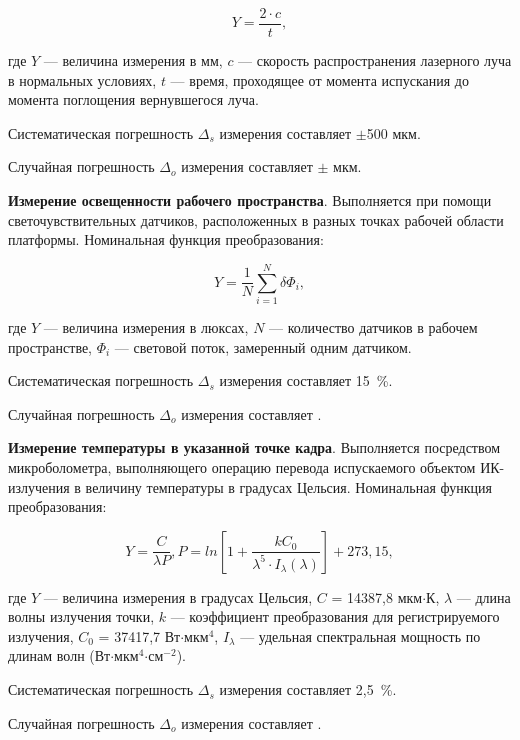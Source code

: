 \begin{equation}
Y = \frac{2 \cdot c}{t},
\label{eq_3_22}
\end{equation}

где $Y$ --- величина измерения в мм, $c$ --- скорость распространения лазерного луча в нормальных условиях, $t$ --- время, проходящее от момента испускания до момента поглощения вернувшегося луча.

Систематическая погрешность $\Delta_s$ измерения составляет $\pm$500 мкм.

Случайная погрешность $\Delta_o$ измерения составляет $\pm$ мкм.

\textbf{Измерение освещенности рабочего пространства}. Выполняется при помощи светочувствительных датчиков, расположенных в разных точках рабочей области платформы. Номинальная функция преобразования:

\begin{equation}
Y = \frac{1}{N} \sum_{i=1}^{N} \delta \Phi_i,
\label{eq_3_23}
\end{equation}

где $Y$ --- величина измерения в люксах, $N$ --- количество датчиков в рабочем пространстве, $\Phi_i$ --- световой поток, замеренный одним датчиком.

Систематическая погрешность $\Delta_s$ измерения составляет 15~\%.

Случайная погрешность $\Delta_o$ измерения составляет .

\textbf{Измерение температуры в указанной точке кадра}. Выполняется посредством микроболометра, выполняющего операцию перевода испускаемого объектом ИК-излучения в величину температуры в градусах Цельсия. Номинальная функция преобразования:

\begin{equation}
Y = \frac{C}{\lambda P}, P = ln[1 + \frac{kC_0}{\lambda^5 \cdot I_\lambda (\lambda)}] + 273,15,
\label{eq_3_24}
\end{equation}

где $Y$ --- величина измерения в градусах Цельсия, $C$ = 14387,8 мкм$\cdot$К, $\lambda$ --- длина волны излучения точки, $k$ --- коэффициент преобразования для регистрируемого излучения, $C_0$ = 37417,7 Вт$\cdot$мкм$^4$, $I_\lambda$ --- удельная спектральная мощность по длинам волн (Вт$\cdot$мкм$^4$$\cdot$см$^{-2}$).

Систематическая погрешность $\Delta_s$ измерения составляет 2,5~\%.

Случайная погрешность $\Delta_o$ измерения составляет .

